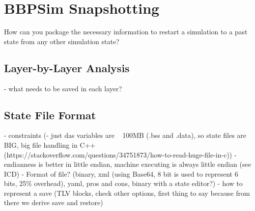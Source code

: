 {
\setlength{\parindent}{2em}
\chapter{BBPSim Snapshotting}\label{cha:bbpsim-impl}
How can you package the necessary information to restart a simulation to a past state from any other simulation state? 
\section{Layer-by-Layer Analysis}
- what needs to be saved in each layer?
\section{State File Format}
- constraints (- just das variables are ~ 100MB (.bss and .data), so state files are BIG, big file handling in C++ (https://stackoverflow.com/questions/34751873/how-to-read-huge-file-in-c))
- endianness is better in little endian, machine executing is always little endian (see ICD)
- Format of file? (binary, xml (using Base64, 8 bit is used to represent 6 bits, 25\% overhead), yaml, pros and cons, binary with a state editor?)
- how to represent a save (TLV blocks, check other options, first thing to say because from there we derive save and restore)

}
